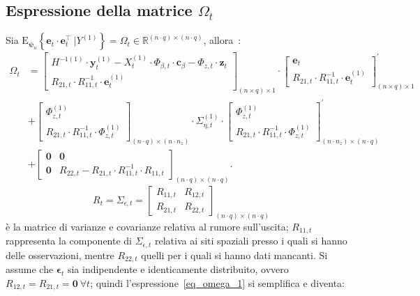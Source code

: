 \subsection[Espressione della matrice $\Omega_t$]{Espressione della matrice $\Omega_t$}
Sia $\text{E}_{\boldsymbol{\psi}_n}\left\{\mathbf{e}_t\cdot\mathbf{e}_t^\top \ \bigg|Y^{(1)}\right\} = \Omega_t\in\mathbb{R}^{(n\cdot q)\times(n\cdot q)}$, allora~\cite{paper_TS_book}:
\begin{equation}
	\begin{split}
		\Omega_t & = \begin{bmatrix}
			H^{-1(1)}\cdot\mathbf{y}_t^{(1)} - X_t^{(1)}\cdot\Phi_{\beta, t}\cdot\mathbf{c}_\beta - \Phi_{z, t}\cdot\mathbf{z}_t \\
			R_{21, t}\cdot R_{11,t}^{-1}\cdot\mathbf{e}_t^{(1)}
		\end{bmatrix}_{(n\times q)\times 1} \cdot \begin{bmatrix}
		\mathbf{e}_t \\
		R_{21,t}\cdot R_{11, t}^{-1}\cdot\mathbf{e}_t^{(1)}
	\end{bmatrix}^\prime_{(n\times q)\times 1} \\
	& + \begin{bmatrix}
		\Phi_{z,t}^{(1)} \\
		R_{21, t}\cdot R_{11, t}^{-1}\cdot\Phi_{z,t}^{(1)}
	\end{bmatrix}_{(n\cdot q)\times(n\cdot n_z)}\cdot\Sigma_{\eta, t}^{(1)}\cdot \begin{bmatrix}
		\Phi_{z,t}^{(1)} \\
	R_{21, t}\cdot R_{11, t}^{-1}\cdot\Phi_{z,t}^{(1)}
	\end{bmatrix}^\prime_{(n\cdot n_z)\times(n\cdot q)} \\
	& + \begin{bmatrix}
		\mathbf{0} & \mathbf{0}\\
		\mathbf{0} & R_{22,t} - R_{21,t}\cdot R_{11,t}^{-1}\cdot R_{11, t}
	\end{bmatrix}_{(n\cdot q)\times(n\cdot q)}.
	\end{split}
	\label{eq_omega_1}
\end{equation}
\[
	R_t = \Sigma_{\epsilon, t} = \begin{bmatrix}
		R_{11, t} & R_{12, t} \\ R_{21, t} & R_{22, t}
	\end{bmatrix}_{(n\cdot q)\times(n\cdot q)}
\]
è la matrice di varianze e covarianze relativa al rumore sull'uscita; $R_{11, t}$ rappresenta la componente di $\Sigma_{\epsilon, t}$ relativa ai siti spaziali presso i quali si hanno delle osservazioni, mentre $R_{22, t}$ quelli per i quali si hanno dati mancanti. Si assume che $\boldsymbol{\epsilon}_t$ sia indipendente e identicamente distribuito, ovvero $R_{12, t} = R_{21, t} = \mathbf{0} \ \forall t$; quindi l'espressione~\ref{eq_omega_1} si semplifica e diventa:
